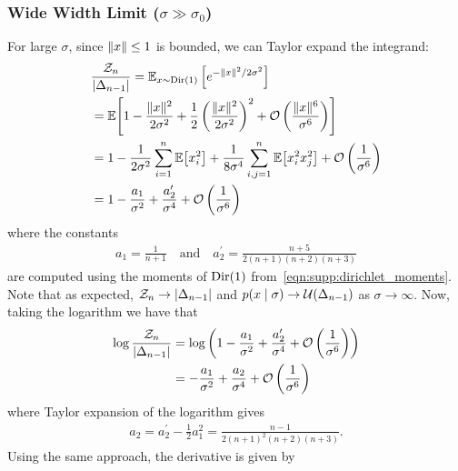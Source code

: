 \subsubsection{Wide Width Limit ($\sigma \gg \sigma_0$)}

For large $\sigma$, since $\lVert x \rVert \le 1$ is bounded, we can Taylor expand the integrand:
\begin{align*}
     & \frac{\mathcal{Z}_n}{|\ProbSimplex{n-1}|} = \mathbb{E}_{\vv{x} \sim \Dir{1}} \left[ e^{ -\lVert \vv{x} \rVert^2 / 2 \sigma^2 } \right]                                                              \\
     & = \Ex{ 1 - \frac{\lVert \vv{x} \rVert^2}{2 \sigma^2} + \frac{1}{2} \left( \frac{\lVert \vv{x} \rVert^2}{2 \sigma^2} \right)^2 + \mathcal{O}\left( \frac{\lVert \vv{x} \rVert^6}{\sigma^6} \right) } \\
     & = 1 - \frac{1}{2 \sigma^2} \sum_{i=1}^n \Ex{ \vv{x}_i^2 } + \frac{1}{8 \sigma^4} \sum_{i,j=1}^n \Ex{ \vv{x}_i^2 \vv{x}_j^2 } + \mathcal{O}\left( \frac{1}{\sigma^6} \right)                         \\
     & = 1 - \frac{a_1}{\sigma^2} + \frac{a_2^\prime}{\sigma^4} + \mathcal{O}\left( \frac{1}{\sigma^6} \right)
\end{align*}
where the constants
\begin{align*}
    a_1 = \frac{1}{n+1} \quad \text{and} \quad a_2^\prime = \frac{n+5}{2 (n+1) (n+2) (n+3)}
\end{align*}
are computed using the moments of $\Dir{1}$ from~\eqref{eqn:supp:dirichlet_moments}.
Note that as expected, $\mathcal{Z}_n \to |\Delta_{n-1}|$ and $p(x \mid \sigma) \to \mathcal{U}(\Delta_{n-1})$ as $\sigma \to \infty$.
Now, taking the logarithm we have that
\begin{align*}
    \log \frac{\mathcal{Z}_n}{|\Delta_{n-1}|}
     & = \log \left(1 - \frac{a_1}{\sigma^2} + \frac{a_2^\prime}{\sigma^4} + \mathcal{O}\left( \frac{1}{\sigma^6} \right)\right) \\
     & = - \frac{a_1}{\sigma^2} + \frac{a_2}{\sigma^4} + \mathcal{O}\left( \frac{1}{\sigma^6} \right)
\end{align*}
where Taylor expansion of the logarithm gives
\begin{align*}
    a_2 = a_2^\prime - \frac{1}{2} a_1^2 = \frac{n-1}{2 (n+1)^2 (n+2) (n+3)}.
\end{align*}
Using the same approach, the derivative is given by
